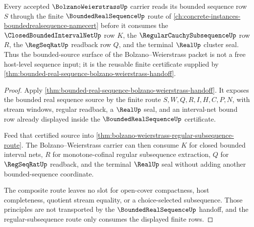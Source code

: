 \begin{theorem}
\label{thm:bolzano-weierstrass-bounded-source-factorization}
Every accepted $\BolzanoWeierstrassUp$ carrier reads its bounded sequence row $S$ through the finite $\BoundedRealSequenceUp$ route of \autoref{ch:concrete-instances-boundedrealsequence-namecert} before it consumes the $\ClosedBoundedIntervalNetUp$ row $K$, the $\RegularCauchySubsequenceUp$ row $R$, the $\RegSeqRatUp$ readback row $Q$, and the terminal $\RealUp$ cluster seal. Thus the bounded-source surface of the Bolzano--Weierstrass packet is not a free host-level sequence input; it is the reusable finite certificate supplied by \autoref{thm:bounded-real-sequence-bolzano-weierstrass-handoff}.
\end{theorem}
\begin{proof}
Apply \autoref{thm:bounded-real-sequence-bolzano-weierstrass-handoff}. It exposes the bounded real sequence source by the finite route $S,W,Q,R,I,H,C,P,N$, with stream windows, regular readback, a $\RealUp$ seal, and an interval-net bound row already displayed inside the $\BoundedRealSequenceUp$ certificate.

Feed that certified source into \autoref{thm:bolzano-weierstrass-regular-subsequence-route}. The Bolzano--Weierstrass carrier can then consume $K$ for closed bounded interval nets, $R$ for monotone-cofinal regular subsequence extraction, $Q$ for $\RegSeqRatUp$ readback, and the terminal $\RealUp$ seal without adding another bounded-sequence coordinate.

The composite route leaves no slot for open-cover compactness, host completeness, quotient stream equality, or a choice-selected subsequence. Those principles are not transported by the $\BoundedRealSequenceUp$ handoff, and the regular-subsequence route only consumes the displayed finite rows.
\end{proof}

